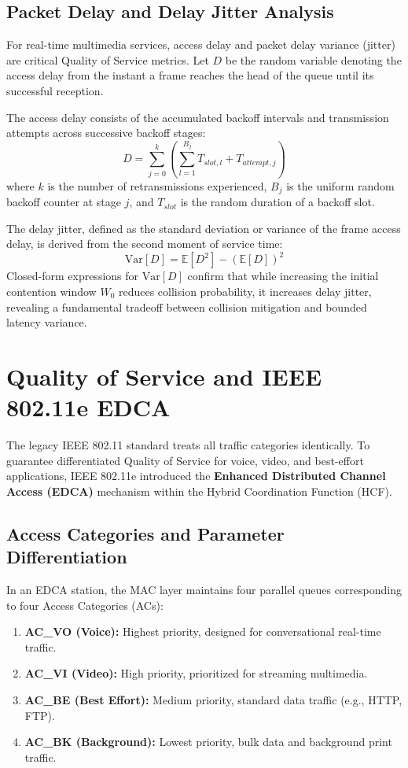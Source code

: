 \subsection{Packet Delay and Delay Jitter Analysis}
For real-time multimedia services, access delay and packet delay variance (jitter) are critical Quality of Service metrics. Let $D$ be the random variable denoting the access delay from the instant a frame reaches the head of the queue until its successful reception.

The access delay consists of the accumulated backoff intervals and transmission attempts across successive backoff stages:
\begin{equation}
    D = \sum_{j=0}^{k} \left( \sum_{l=1}^{B_j} T_{slot, l} + T_{attempt, j} \right)
\end{equation}
where $k$ is the number of retransmissions experienced, $B_j$ is the uniform random backoff counter at stage $j$, and $T_{slot}$ is the random duration of a backoff slot.

The delay jitter, defined as the standard deviation or variance of the frame access delay, is derived from the second moment of service time:
\begin{equation}
    \mathrm{Var}[D] = \mathbb{E}[D^2] - (\mathbb{E}[D])^2
\end{equation}
Closed-form expressions for $\mathrm{Var}[D]$ confirm that while increasing the initial contention window $W_0$ reduces collision probability, it increases delay jitter, revealing a fundamental tradeoff between collision mitigation and bounded latency variance.

\section{Quality of Service and IEEE 802.11e EDCA}
The legacy IEEE 802.11 standard treats all traffic categories identically. To guarantee differentiated Quality of Service for voice, video, and best-effort applications, IEEE 802.11e introduced the \textbf{Enhanced Distributed Channel Access (EDCA)} mechanism within the Hybrid Coordination Function (HCF).

\subsection{Access Categories and Parameter Differentiation}
In an EDCA station, the MAC layer maintains four parallel queues corresponding to four Access Categories (ACs):
\begin{enumerate}
    \item \textbf{AC\_VO (Voice):} Highest priority, designed for conversational real-time traffic.
    \item \textbf{AC\_VI (Video):} High priority, prioritized for streaming multimedia.
    \item \textbf{AC\_BE (Best Effort):} Medium priority, standard data traffic (e.g., HTTP, FTP).
    \item \textbf{AC\_BK (Background):} Lowest priority, bulk data and background print traffic.
\end{enumerate}

